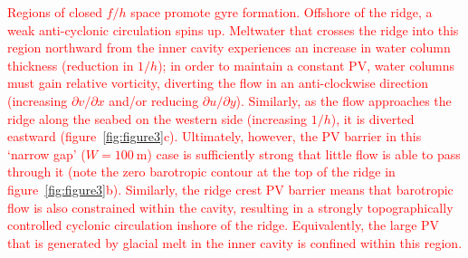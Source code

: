 \documentclass[draft]{agujournal2019}
\newcommand{\red}[1]{\textcolor{red}{#1}}
\begin{document}


\red{Regions of closed $f/h$ space promote gyre formation. Offshore of the ridge, a weak anti-cyclonic circulation spins up. Meltwater that crosses the ridge into this region northward from the inner cavity experiences an increase in water column thickness (reduction in $1/h$); in order to maintain a constant PV, water columns must gain relative vorticity, diverting the flow in an anti-clockwise direction (increasing $\partial v / \partial x$ and/or reducing $\partial u / \partial y$). Similarly, as the flow approaches the ridge along the seabed on the western side (increasing $1/h$), it is diverted eastward (figure~\ref{fig:figure3}c). Ultimately, however, the PV barrier in this `narrow gap' ($W=100~\text{m}$) case is sufficiently strong that little flow is able to pass through it (note the zero barotropic contour at the top of the ridge in figure~\ref{fig:figure3}b). Similarly, the ridge crest PV barrier means that barotropic flow is also constrained within the cavity, resulting in a strongly topographically controlled cyclonic circulation inshore of the ridge. Equivalently, the large PV that is generated by glacial melt in the inner cavity is confined within this region.}
\end{document}
